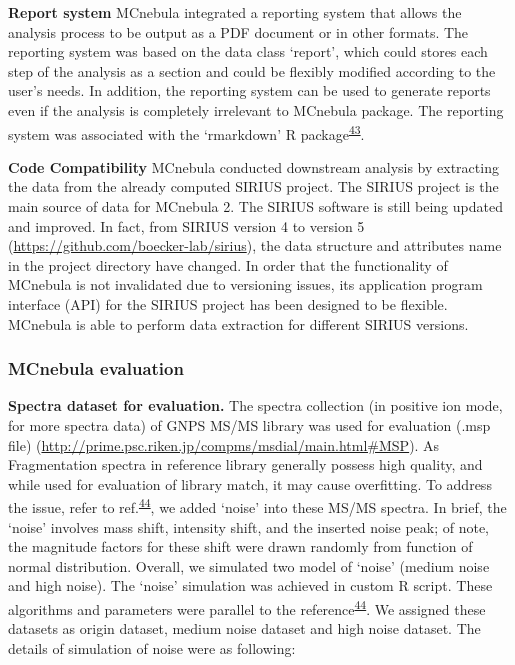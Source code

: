 \documentclass[
]{article}
\begin{document}
\textbf{Report system} MCnebula integrated a reporting system that
allows the analysis process to be output as a PDF document or in other
formats. The reporting system was based on the data class `report',
which could stores each step of the analysis as a section and could be
flexibly modified according to the user's needs. In addition, the
reporting system can be used to generate reports even if the analysis is
completely irrelevant to MCnebula package. The reporting system was
associated with the `rmarkdown' R
package\textsuperscript{\protect\hyperlink{ref-xie_r_2020}{43}}.

\textbf{Code Compatibility} MCnebula conducted downstream analysis by
extracting the data from the already computed SIRIUS project. The SIRIUS
project is the main source of data for MCnebula 2. The SIRIUS software
is still being updated and improved. In fact, from SIRIUS version 4 to
version 5 (\url{https://github.com/boecker-lab/sirius}), the data
structure and attributes name in the project directory have changed. In
order that the functionality of MCnebula is not invalidated due to
versioning issues, its application program interface (API) for the
SIRIUS project has been designed to be flexible. MCnebula is able to
perform data extraction for different SIRIUS versions.

\hypertarget{mcnebula-evaluation}{%
\subsubsection{MCnebula evaluation}\label{mcnebula-evaluation}}

\textbf{Spectra dataset for evaluation.} The spectra collection (in
positive ion mode, for more spectra data) of GNPS MS/MS library was used
for evaluation (.msp file)
(\url{http://prime.psc.riken.jp/compms/msdial/main.html\#MSP}). As
Fragmentation spectra in reference library generally possess high
quality, and while used for evaluation of library match, it may cause
overfitting. To address the issue, refer to
ref.\textsuperscript{\protect\hyperlink{ref-2021}{44}}, we added `noise'
into these MS/MS spectra. In brief, the `noise' involves mass shift,
intensity shift, and the inserted noise peak; of note, the magnitude
factors for these shift were drawn randomly from function of normal
distribution. Overall, we simulated two model of `noise' (medium noise
and high noise). The `noise' simulation was achieved in custom R script.
These algorithms and parameters were parallel to the
reference\textsuperscript{\protect\hyperlink{ref-2021}{44}}. We assigned
these datasets as origin dataset, medium noise dataset and high noise
dataset. The details of simulation of noise were as following:
\end{document}
